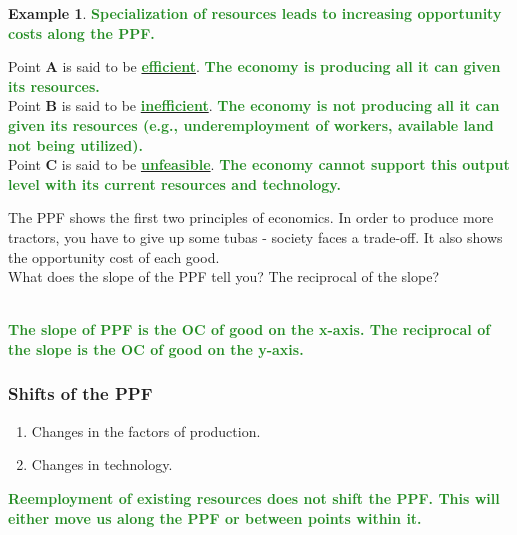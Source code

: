 \documentclass[11pt]{article}\usepackage[]{graphicx}\usepackage[]{color}
\theoremstyle{definition}
\newtheorem{exmp}{Example}[section]
\newcommand{\blank}[1]{}
\newcommand{\ddp}[1]{{\textbf{\textcolor{ForestGreen}{#1}}}}
\newcommand{\dd}[1]{{\underline{\textbf{\textcolor{ForestGreen}{#1}}}}}
\begin{document}
\begin{exmp}
	\ddp{Specialization of resources leads to increasing opportunity costs along the PPF.\\}
	
	Point \textbf{A} is said to be \dd{efficient}. 
	\ddp{The economy is producing all it can given its resources.}
	\\
	
	Point \textbf{B} is said to be \dd{inefficient}. 
	\ddp{The economy is not producing all it can given its resources (e.g., underemployment of workers, available land not being utilized).}
	\\
	
	Point \textbf{C} is said to be \dd{unfeasible}. 
	\ddp{The economy cannot support this output level with its current resources and technology.}
	\end{exmp}
	
	The PPF shows the first two principles of economics. In order to produce more tractors, you have to give up some tubas - society faces a trade-off. It also shows the opportunity cost of each good. 
	\\
	
	What does the slope of the PPF tell you? The reciprocal of the slope?
	\blank{}
	\ddp{\\ The slope of PPF is the OC of good on the x-axis. The reciprocal of the slope is the OC of good on the y-axis.}
	
	\subsubsection*{Shifts of the PPF}
	
	\begin{enumerate}
		\item Changes in the factors of production.
			
		\item Changes in technology.
		
	\end{enumerate}
	
	\ddp{Reemployment of existing resources does not shift the PPF. This will either move us along the PPF or between points within it.}
	
\end{document}
